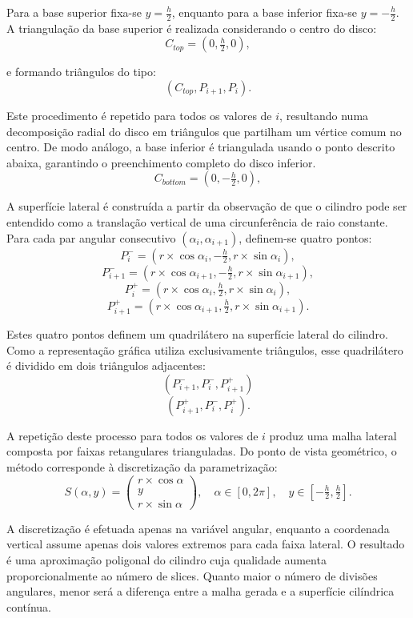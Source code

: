 \documentclass[11pt, a4paper, fleqn]{article}
\begin{document}
\noindent Para a base superior fixa-se $y = \frac{h}{2}$, enquanto para a base inferior fixa-se $y = -\frac{h}{2}$. A triangulação da base superior é realizada considerando o centro do disco:
\[
C_{top} = (0,\tfrac{h}{2},0),
\]

\noindent e formando triângulos do tipo:
\[
(C_{top}, P_{i+1}, P_i).
\]

\noindent Este procedimento é repetido para todos os valores de $i$, resultando numa decomposição radial do disco em triângulos que partilham um vértice comum no centro. De modo análogo, a base inferior é triangulada usando o ponto descrito abaixa, garantindo o preenchimento completo do disco inferior.
\[
C_{bottom} = (0,-\tfrac{h}{2},0),
\]

\noindent A superfície lateral é construída a partir da observação de que o cilindro pode ser entendido como a translação vertical de uma circunferência de raio constante. Para cada par angular consecutivo $(\alpha_i, \alpha_{i+1})$, definem-se quatro pontos:
\[
P_i^- = (r \times \cos\alpha_i, -\tfrac{h}{2}, r \times \sin\alpha_i),
\]
\[
P_{i+1}^- = (r \times \cos\alpha_{i+1}, -\tfrac{h}{2}, r \times \sin\alpha_{i+1}),
\]
\[
P_i^+ = (r \times \cos\alpha_i, \tfrac{h}{2}, r \times \sin\alpha_i),
\]
\[
P_{i+1}^+ = (r \times \cos\alpha_{i+1}, \tfrac{h}{2}, r \times \sin\alpha_{i+1}).
\]

\noindent Estes quatro pontos definem um quadrilátero na superfície lateral do cilindro. Como a representação gráfica utiliza exclusivamente triângulos, esse quadrilátero é dividido em dois triângulos adjacentes:
\[
(P_{i+1}^-, P_i^-, P_{i+1}^+)
\]
\[
(P_{i+1}^+, P_i^-, P_i^+).
\]

\noindent A repetição deste processo para todos os valores de $i$ produz uma malha lateral composta por faixas retangulares trianguladas. Do ponto de vista geométrico, o método corresponde à discretização da parametrização:
\[
S(\alpha, y) =
\begin{pmatrix}
r \times \cos\alpha \\
y \\
r \times \sin\alpha
\end{pmatrix},
\quad
\alpha \in [0,2\pi],
\quad
y \in \left[-\tfrac{h}{2}, \tfrac{h}{2}\right].
\]

\noindent A discretização é efetuada apenas na variável angular, enquanto a coordenada vertical assume apenas dois valores extremos para cada faixa lateral. O resultado é uma aproximação poligonal do cilindro cuja qualidade aumenta proporcionalmente ao número de slices. Quanto maior o número de divisões angulares, menor será a diferença entre a malha gerada e a superfície cilíndrica contínua.
\end{document}
